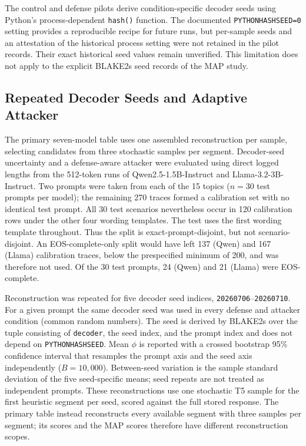 \documentclass[electronics,article,submit,pdftex,moreauthors]{Definitions/mdpi}
\begin{document}
The control and defense pilots derive condition-specific decoder seeds using Python's process-dependent \texttt{hash()} function. The documented \texttt{PYTHONHASHSEED=0} setting provides a reproducible recipe for future runs, but per-sample seeds and an attestation of the historical process setting were not retained in the pilot records. Their exact historical seed values remain unverified. This limitation does not apply to the explicit BLAKE2s seed records of the MAP study.

\subsection{Repeated Decoder Seeds and Adaptive Attacker}\label{sec:robustness-methods}
The primary seven-model table uses one assembled reconstruction per sample, selecting candidates from three stochastic samples per segment. Decoder-seed uncertainty and a defense-aware attacker were evaluated using direct logged lengths from the 512-token runs of Qwen2.5-1.5B-Instruct and Llama-3.2-3B-Instruct. Two prompts were taken from each of the 15 topics ($n=30$ test prompts per model); the remaining 270 traces formed a calibration set with no identical test prompt. All 30 test scenarios nevertheless occur in 120 calibration rows under the other four wording templates. The test uses the first wording template throughout. Thus the split is exact-prompt-disjoint, but not scenario-disjoint. An EOS-complete-only split would have left 137 (Qwen) and 167 (Llama) calibration traces, below the prespecified minimum of 200, and was therefore not used. Of the 30 test prompts, 24 (Qwen) and 21 (Llama) were EOS-complete.

Reconstruction was repeated for five decoder seed indices, \texttt{20260706}--\texttt{20260710}. For a given prompt the same decoder seed was used in every defense and attacker condition (common random numbers). The seed is derived by BLAKE2s over the tuple consisting of \texttt{decoder}, the seed index, and the prompt index and does not depend on \texttt{PYTHONHASHSEED}. Mean $\phi$ is reported with a crossed bootstrap 95\% confidence interval that resamples the prompt axis and the seed axis independently ($B=10{,}000$). Between-seed variation is the sample standard deviation of the five seed-specific means; seed repeats are not treated as independent prompts. These reconstructions use one stochastic T5 sample for the first heuristic segment per seed, scored against the full stored response. The primary table instead reconstructs every available segment with three samples per segment; its scores and the MAP scores therefore have different reconstruction scopes.
\end{document}
